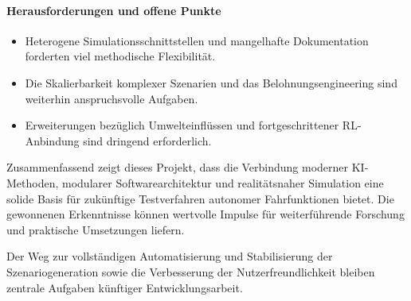 \paragraph{Herausforderungen und offene Punkte}
\begin{itemize}
    \item Heterogene Simulationsschnittstellen und mangelhafte Dokumentation forderten viel methodische Flexibilität.
    \item Die Skalierbarkeit komplexer Szenarien und das Belohnungsengineering sind weiterhin anspruchsvolle Aufgaben.
    \item Erweiterungen bezüglich Umwelteinflüssen und fortgeschrittener RL-Anbindung sind dringend erforderlich.
\end{itemize}

Zusammenfassend zeigt dieses Projekt, dass die Verbindung moderner KI-Methoden, modularer Softwarearchitektur und realitätsnaher Simulation eine solide Basis für zukünftige Testverfahren autonomer Fahrfunktionen bietet. Die gewonnenen Erkenntnisse können wertvolle Impulse für weiterführende Forschung und praktische Umsetzungen liefern.

Der Weg zur vollständigen Automatisierung und Stabilisierung der Szenariogeneration sowie die Verbesserung der Nutzerfreundlichkeit bleiben zentrale Aufgaben künftiger Entwicklungsarbeit.
